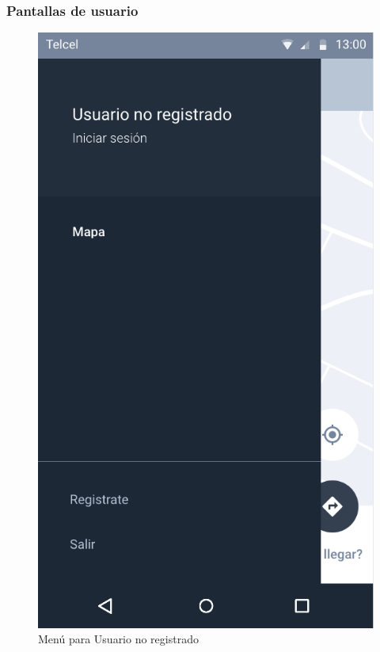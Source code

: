 \subsubsection{Pantallas de usuario}\label{Pantallas-Usuario}
\begin{figure}[H]
	\centering
	\includegraphics[scale=.55]{Capitulo4/software/submodulos/images/menu-usuario-no-registrado}
	\caption{Menú para Usuario no registrado}
	\label{fig:menu-usuario}
\end{figure}

